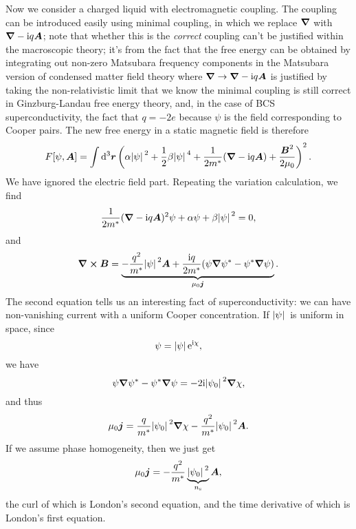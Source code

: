 \documentclass[hyperref, a4paper]{article}
\newcommand*{\ii}{\mathrm{i}}
\newcommand*{\ee}{\mathrm{e}}
\begin{document}
Now we consider a charged liquid with electromagnetic coupling.
The coupling can be introduced easily using minimal coupling, 
in which we replace $\grad$ with $\grad - \ii q \vb*{A}$;
note that whether this is the \emph{correct} coupling 
can't be justified within the macroscopic theory;
it's from the fact that the free energy can be obtained by 
integrating out non-zero Matsubara frequency components 
in the Matsubara version of condensed matter field theory
where $\grad \to \grad - \ii q \vb*{A}$ 
is justified by taking the non-relativistic limit 
that we know the minimal coupling is still correct 
in Ginzburg-Landau free energy theory,
and, in the case of BCS superconductivity,
the fact that $q = - 2 e$ because $\psi$ is the field corresponding to Cooper pairs.
The new free energy in a static magnetic field is therefore 
\begin{equation}
    F[\psi, \vb*{A}] = \int \dd[3]{\vb*{r}}
    \left(
        \alpha \abs*{\psi}^2 + \frac{1}{2} \beta \abs*{\psi}^4 
        + \frac{1}{2 m^*} (\grad - \ii q \vb*{A})
        + \frac{\vb*{B}^2}{2 \mu_0}
    \right)^2.
\end{equation}
We have ignored the electric field part.
Repeating the variation calculation, we find 
\begin{equation}
    \frac{1}{2m^*} (\grad - \ii q \vb*{A})^2 \psi + \alpha \psi + \beta \abs*{\psi}^2 = 0, 
\end{equation}
and 
\begin{equation}
    \curl{\vb*{B}} = \underbrace{
        - \frac{q^2}{m^*} \abs*{\psi}^2 \vb*{A} 
        + \frac{\ii q}{2 m^*} (\psi \grad \psi^* - \psi^* \grad \psi)
    }_{\mu_0 \vb*{j}}.
    \label{eq:b-and-j}
\end{equation}
The second equation tells us an interesting fact of superconductivity:
we can have non-vanishing current with a uniform Cooper concentration.
If $\abs*{\psi}$ is uniform in space, 
since 
\begin{equation}
    \psi = \abs*{\psi} \ee^{\ii \chi},
\end{equation}
we have 
\begin{equation}
    \psi \grad{\psi^*} - \psi^* \grad{\psi}
    = - 2 \ii \abs*{\psi_0}^2 \grad{\chi},
\end{equation}
and thus 
\begin{equation}
    \mu_0 \vb*{j} = \frac{q}{m^*} \abs*{\psi_0}^2 \grad{\chi} - \frac{q^2}{m^*} \abs*{\psi_0}^2 \vb*{A}.
\end{equation}
If we assume phase homogeneity, 
then we just get 
\begin{equation}
    \mu_0 \vb*{j} = - \frac{q^2}{m^*} \underbrace{\abs*{\psi_0}^2}_{n_{\text{s}}} \vb*{A},
\end{equation}
the curl of which is London's second equation,
and the time derivative of which is London's first equation.
\end{document}
